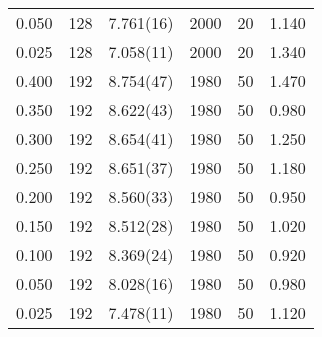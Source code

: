 \begin{tabular}{rrlrrr}
 0.050 &     128 & 7.761(16) &                2000 &                  20 &    1.140 \\
 0.025 &     128 & 7.058(11) &                2000 &                  20 &    1.340 \\
 0.400 &     192 & 8.754(47) &                1980 &                  50 &    1.470 \\
 0.350 &     192 & 8.622(43) &                1980 &                  50 &    0.980 \\
 0.300 &     192 & 8.654(41) &                1980 &                  50 &    1.250 \\
 0.250 &     192 & 8.651(37) &                1980 &                  50 &    1.180 \\
 0.200 &     192 & 8.560(33) &                1980 &                  50 &    0.950 \\
 0.150 &     192 & 8.512(28) &                1980 &                  50 &    1.020 \\
 0.100 &     192 & 8.369(24) &                1980 &                  50 &    0.920 \\
 0.050 &     192 & 8.028(16) &                1980 &                  50 &    0.980 \\
 0.025 &     192 & 7.478(11) &                1980 &                  50 &    1.120 \\
\hline
\end{tabular}
